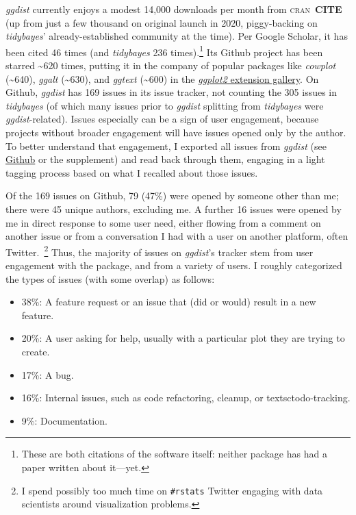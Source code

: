 \documentclass[journal]{vgtc}                     %
\begin{document}
\textit{ggdist} currently enjoys a modest 14,000 downloads per month from \textsc{cran}~\textbf{CITE} (up from just a few thousand on original launch in 2020, piggy-backing on \textit{tidybayes}' already-established community at the time). Per Google Scholar, it has been cited 46 times (and \textit{tidybayes} 236 times).\footnote{These are both citations of the software itself: neither package has had a paper written about it---yet.} Its Github project has been starred \textasciitilde 620 times, putting it in the company of popular packages like \textit{cowplot} (\textasciitilde 640), \textit{ggalt} (\textasciitilde 630), and \textit{ggtext} (\textasciitilde 600) in the \href{https://exts.ggplot2.tidyverse.org/gallery/}{\textit{ggplot2} extension gallery}. On Github, \textit{ggdist} has 169 issues in its issue tracker, not counting the 305 issues in \textit{tidybayes} (of which many issues prior to \textit{ggdist} splitting from \textit{tidybayes }were \textit{ggdist}-related). Issues especially can be a sign of user engagement, because projects without broader engagement will have issues opened only by the author. To better understand that engagement, I exported all issues from \textit{ggdist} (see \href{https://github.com/mjskay/ggdist/issues}{Github} or the supplement) and read back through them, engaging in a light tagging process based on what I recalled about those issues.

Of the 169 issues on Github, 79 (47\%) were opened by someone other than me; there were 45 unique authors, excluding me. A further 16 issues were opened by me in direct response to some user need, either flowing from a comment on another issue or from a conversation I had with a user on another platform, often Twitter.~\footnote{I spend possibly too much time on \texttt{\#rstats} Twitter engaging with data scientists around visualization problems.} Thus, the majority of issues on \textit{ggdist}'s tracker stem from user engagement with the package, and from a variety of users. I roughly categorized the types of issues (with some overlap) as follows:

\begin{itemize}
    \item 38\%: A feature request or an issue that (did or would) result in a new feature.
    \item 20\%: A user asking for help, usually with a particular plot they are trying to create.
    \item 17\%: A bug.
    \item 16\%: Internal issues, such as code refactoring, cleanup, or textsc{todo}-tracking.
    \item 9\%: Documentation.
\end{itemize}
\end{document}
